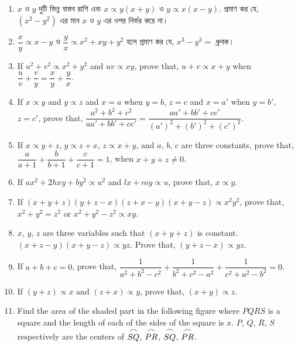 \documentclass[11pt, a4paper]{article}
\begin{document}
\begin{enumerate}
	\item $x$ \textbengali{ও} $y$ \textbengali{দুটি ভিন্ন বাস্তব রাশি এবং} $x \propto y(x+y)$ \textbengali{ও} $y \propto x(x-y)$. \textbengali{প্রমাণ কর যে,} $(x^2 - y^2)$ \textbengali{এর মান} $x$ \textbengali{ও} $y$ \textbengali{এর ওপর নির্ভর করে না।}
	
	\item $\dfrac{x}{y} \propto x-y $ \textbengali{ও} $\dfrac{y}{x} \propto x^2 + xy + y^2 $ \textbengali{হলে প্রমাণ কর যে,} $x^3 - y^3 = $ \textbengali{ধ্রুবক।}
	
	\item If $u^2 + v^2 \propto x^2 + y^2$ and $uv \propto xy$, prove that, $u+v \propto x+y$ when $\dfrac{u}{v} + \dfrac{v}{y} = \dfrac{x}{y} + \dfrac{y}{x}$.
	
	\item If $x \propto y$ and $y \propto z$ and $x=a$ when $y=b$, $z=c$ and $x = a'$ when $y = b'$, $z=c'$, prove that, $\dfrac{a^2 + b^2 + c^2}{aa' + bb' + cc'} = \dfrac{aa' + bb' + cc'}{(a')^2 + (b')^2 + (c')^2}$.
	
	\item If $x \propto y + z$, $y \propto z + x$, $z \propto x + y$, and $a$, $b$, $c$ are three constants, prove that, $\dfrac{a}{a+1} + \dfrac{b}{b+1} + \dfrac{c}{c+1} = 1$, when $x+y+z \neq 0$.
	
	\item If $ax^2 + 2hxy + by^2 \propto u^2$ and $lx+my \propto u$, prove that, $x \propto y$.
	
	\item If $(x+y+z)(y+z-x)(z+x-y)(x+y-z) \propto x^2y^2$, prove that, $x^2 + y^2 = z^2$ or $x^2 + y^2 - z^2 \propto xy$.
	
	\item $x$, $y$, $z$ are three variables such that $(x+y+z)$ is constant. $(x+z-y)(x+y-z) \propto yz$. Prove that, $(y+z-x) \propto yz$.
	
	\item If $a+b+c=0$, prove that, $\dfrac{1}{a^2 + b^2 - c^2} + \dfrac{1}{b^2 + c^2 - a^2} + \dfrac{1}{c^2 + a^2 - b^2} = 0$.
	
	\item If $(y+z) \propto x$ and $(z+x) \propto y$, prove that, $(x+y) \propto z$.



	\item Find the area of the shaded part in the following figure where $PQRS$ is a square and the length of each of the sides of the square is $x$. $P$, $Q$, $R$, $S$ respectively are the centers of ${\stackrel{{\mbox{$\Large{\frown}$}}}{SQ}}$, ${\stackrel{{\mbox{$\Large{\frown}$}}}{PR}}$, ${\stackrel{{\mbox{$\Large{\frown}$}}}{SQ}}$, ${\stackrel{{\mbox{$\Large{\frown}$}}}{PR}}$.
		

\end{enumerate}
\end{document}
